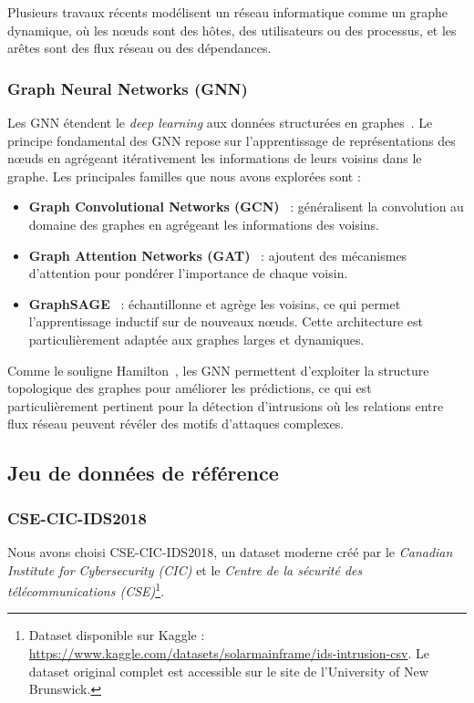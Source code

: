﻿\documentclass[11pt,a4paper]{article}
\begin{document}
Plusieurs travaux récents modélisent un réseau informatique comme un graphe dynamique, où les nœuds sont des hôtes, des utilisateurs ou des processus, et les arêtes sont des flux réseau ou des dépendances.

\subsubsection{Graph Neural Networks (GNN)}

Les GNN étendent le \emph{deep learning} aux données structurées en graphes~\cite{hamilton2020graph}. Le principe fondamental des GNN repose sur l'apprentissage de représentations des nœuds en agrégeant itérativement les informations de leurs voisins dans le graphe. Les principales familles que nous avons explorées sont :
\begin{itemize}
    \item \textbf{Graph Convolutional Networks (GCN)}~\cite{kipf2017semi} : généralisent la convolution au domaine des graphes en agrégeant les informations des voisins.
    \item \textbf{Graph Attention Networks (GAT)}~\cite{velickovic2018graph} : ajoutent des mécanismes d'attention pour pondérer l'importance de chaque voisin.
    \item \textbf{GraphSAGE}~\cite{hamilton2017inductive} : échantillonne et agrège les voisins, ce qui permet l'apprentissage inductif sur de nouveaux nœuds. Cette architecture est particulièrement adaptée aux graphes larges et dynamiques.
\end{itemize}

Comme le souligne Hamilton~\cite{hamilton2020graph}, les GNN permettent d'exploiter la structure topologique des graphes pour améliorer les prédictions, ce qui est particulièrement pertinent pour la détection d'intrusions où les relations entre flux réseau peuvent révéler des motifs d'attaques complexes.

\subsection{Jeu de données de référence}

\subsubsection{CSE-CIC-IDS2018}

Nous avons choisi CSE-CIC-IDS2018, un dataset moderne créé par le \emph{Canadian Institute for Cybersecurity (CIC)} et le \emph{Centre de la sécurité des télécommunications (CSE)}\footnote{Dataset disponible sur Kaggle : \url{https://www.kaggle.com/datasets/solarmainframe/ids-intrusion-csv}. Le dataset original complet est accessible sur le site de l'University of New Brunswick.}.
\end{document}
